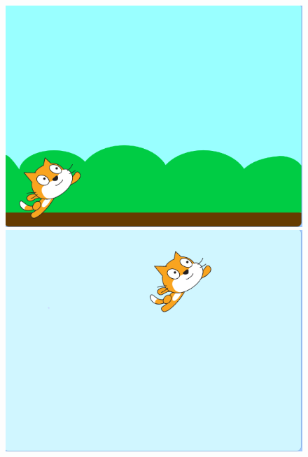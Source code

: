 \documentclass[10pt, a4paper]{article}
\begin{document}
\begin{enumerate}
\begin{figure}[htb]
\begin{minipage}[t]{.19\textwidth}
            \end{minipage}
            \begin{minipage}[t]{.19\textwidth}
                \centering
                \includegraphics[width=.9\textwidth]{37-5.png}
            \end{minipage}
            \begin{minipage}[t]{.19\textwidth}
                \centering
                \includegraphics[width=.9\textwidth]{37-1.png}
            \end{minipage}
        \end{figure}
    \end{enumerate}
\end{document}
